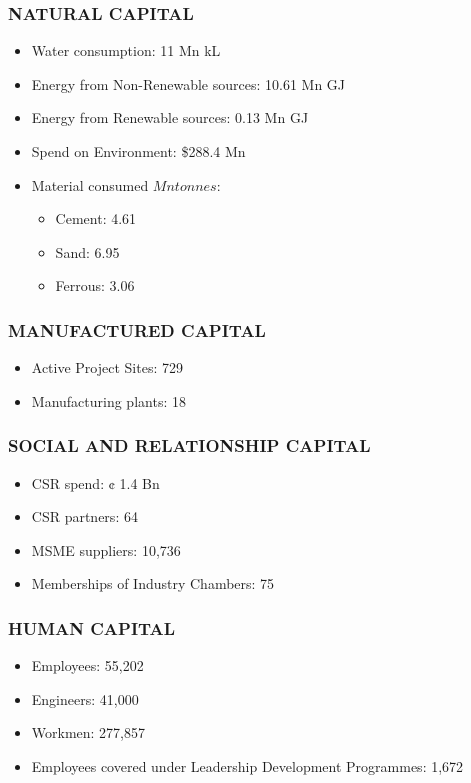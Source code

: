 \subsubsection{NATURAL CAPITAL}
\begin{itemize}
  \item Water consumption: 11 Mn kL
  \item Energy from Non-Renewable sources: 10.61 Mn GJ 
  \item Energy from Renewable sources: 0.13 Mn GJ
  \item Spend on Environment: \$288.4 Mn 
  \item Material consumed \(Mn tonnes\):
    \begin{itemize}
      \item Cement: 4.61 
      \item Sand: 6.95 
      \item Ferrous: 3.06
    \end{itemize}
\end{itemize}

\subsubsection{MANUFACTURED CAPITAL}
\begin{itemize}
  \item Active Project Sites: 729 
  \item Manufacturing plants: 18
\end{itemize}

\subsubsection{SOCIAL AND RELATIONSHIP CAPITAL}
\begin{itemize}
  \item CSR spend: ¢ 1.4 Bn 
  \item CSR partners: 64
  \item MSME suppliers: 10,736
  \item Memberships of Industry Chambers: 75
\end{itemize}

\subsubsection{HUMAN CAPITAL}
\begin{itemize}
  \item Employees: 55,202
  \item Engineers: 41,000 
  \item Workmen: 277,857 
  \item Employees covered under Leadership Development Programmes: 1,672
\end{itemize}

